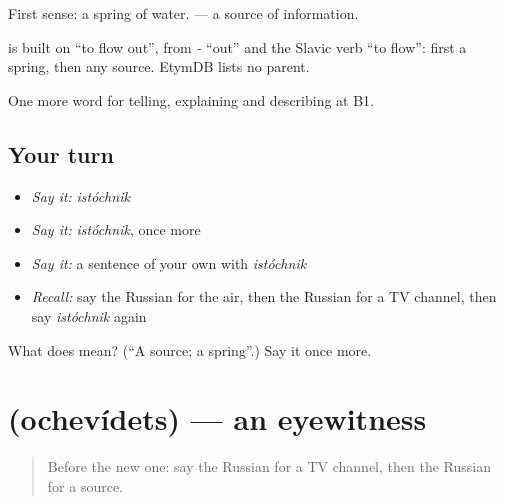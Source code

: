 First sense: a spring of water. \emph{ } — a source of information.

\begin{cousinweb}
\emph{} is built on \emph{} \textquotedblleft{}to flow out\textquotedblright{}, from \emph{-} \textquotedblleft{}out\textquotedblright{} and the Slavic verb \emph{} \textquotedblleft{}to flow\textquotedblright{}: first a spring, then any source. EtymDB lists no parent.
\end{cousinweb}

\begin{grammarlens}[title={What you've built}]
One more word for telling, explaining and describing at B1.
\end{grammarlens}

\subsection*{Your turn}
\begin{itemize}
\raggedright
  \item \emph{Say it:} \emph{istóchnik}
  \item \emph{Say it:} \emph{istóchnik}, once more
  \item \emph{Say it:} a sentence of your own with \emph{istóchnik}
  \item \emph{Recall:} say the Russian for the air, then the Russian for a TV channel, then say \emph{istóchnik} again
\end{itemize}

\begin{tcolorbox}[breakable,colback=teal!4,colframe=teal!35!black,title={Before you move on}]
What does  mean? (\textquotedblleft{}A source; a spring\textquotedblright{}.) Say it once more.
\end{tcolorbox}
\section[\texorpdfstring{\ru{очевидец} (ochevídets)}{очевидец (ochevídets)}]{ (ochevídets) — an eyewitness}

\label{lesson:RU-C282-ochevidets}



\begin{quote}
Before the new one: say the Russian for a TV channel, then the Russian for a source.
\end{quote}

